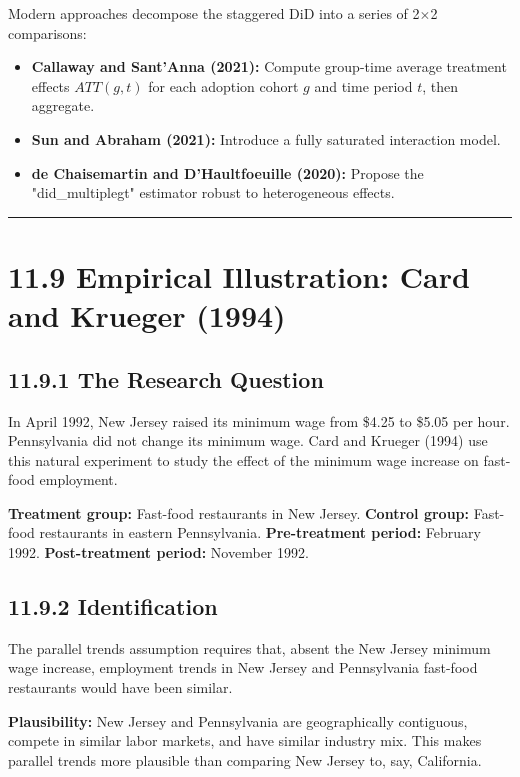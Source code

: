 Modern approaches decompose the staggered DiD into a series of 2$\times$2 comparisons:

\begin{itemize}
\item \textbf{Callaway and Sant'Anna (2021):} Compute group-time average treatment effects $ATT(g,t)$ for each adoption cohort $g$ and time period $t$, then aggregate.
\item \textbf{Sun and Abraham (2021):} Introduce a fully saturated interaction model.
\item \textbf{de Chaisemartin and D'Haultfoeuille (2020):} Propose the "did\_multiplegt" estimator robust to heterogeneous effects.
\end{itemize}

\medskip\hrule\medskip

\section{11.9 Empirical Illustration: Card and Krueger (1994)}

\subsection{11.9.1 The Research Question}

In April 1992, New Jersey raised its minimum wage from \$4.25 to \$5.05 per hour. Pennsylvania did not change its minimum wage. Card and Krueger (1994) use this natural experiment to study the effect of the minimum wage increase on fast-food employment.

\textbf{Treatment group:} Fast-food restaurants in New Jersey.  
\textbf{Control group:} Fast-food restaurants in eastern Pennsylvania.  
\textbf{Pre-treatment period:} February 1992.  
\textbf{Post-treatment period:} November 1992.

\subsection{11.9.2 Identification}

The parallel trends assumption requires that, absent the New Jersey minimum wage increase, employment trends in New Jersey and Pennsylvania fast-food restaurants would have been similar.

\textbf{Plausibility:} New Jersey and Pennsylvania are geographically contiguous, compete in similar labor markets, and have similar industry mix. This makes parallel trends more plausible than comparing New Jersey to, say, California.

